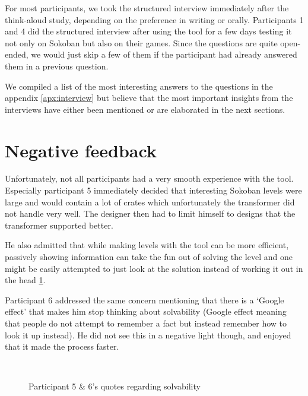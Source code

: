 For most participants, we took the structured interview immediately after the think-aloud study, depending on the preference in writing or orally. Participants 1 and 4 did the structured interview after using the tool for a few days testing it not only on Sokoban but also on their games. Since the questions are quite open-ended, we would just skip a few of them if the participant had already answered them in a previous question. 

We compiled a list of the most interesting answers to the questions in the appendix \autoref{apx:interview} but believe that the most important insights from the interviews have either been mentioned or are elaborated in the next sections.



\section{Negative feedback}

Unfortunately, not all participants had a very smooth experience with the tool. Especially participant 5 immediately decided that interesting Sokoban levels were large and would contain a lot of crates which unfortunately the transformer did not handle very well. The designer then had to limit himself to designs that the transformer supported better.

He also admitted that while making levels with the tool can be more efficient, passively showing information can take the fun out of solving the level and one might be easily attempted to just look at the solution instead of working it out in the head \ref{fig:part5comments}.

Participant 6 addressed the same concern mentioning that there is a `Google effect' that makes him stop thinking about solvability (Google effect meaning that people do not attempt to remember a fact but instead remember how to look it up instead). He did not see this in a negative light though, and enjoyed that it made the process faster.

\begin{figure}
\begin{minipage}[t]{\textwidth}
\textit{} \hfill \\

\textit{}

\textit{}

\end{minipage}
\caption{Participant 5 \& 6's quotes regarding solvability\label{fig:part5comments}}
\end{figure}



